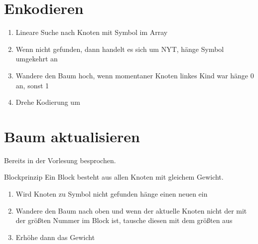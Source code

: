 \documentclass[utf8x]{beamer}
\begin{document}
    \section{Enkodieren}
    \frame{\tableofcontents[currentsection]}
    \begin{frame}[<+->]
    
        \begin{enumerate}[1.]
            \item
                Lineare Suche nach Knoten mit Symbol im Array

            \item
                Wenn nicht gefunden, dann handelt es sich um NYT, hänge Symbol umgekehrt an
            \item
                Wandere den Baum hoch, wenn momentaner Knoten linkes Kind war hänge 0 an, sonst 1
            \item
                Drehe Kodierung um

        \end{enumerate}

    \end{frame}


    \section{Baum aktualisieren}
    \frame{\tableofcontents[currentsection]}
    \begin{frame}[<+->]
        Bereits in der Vorlesung besprochen.
        \pause
        \begin{block}{Blockprinzip}
            Ein Block besteht aus allen Knoten mit gleichem Gewicht.
        \end{block}
        \pause
        \begin{enumerate}[1.]
            \item
                Wird Knoten zu Symbol nicht gefunden hänge einen neuen ein
            \item
                Wandere den Baum nach oben und wenn der aktuelle Knoten nicht der mit der größten Nummer im Block ist, tausche diesen mit dem größten aus
            \item
                Erhöhe dann das Gewicht
        \end{enumerate}
    \end{frame}
\end{document}
